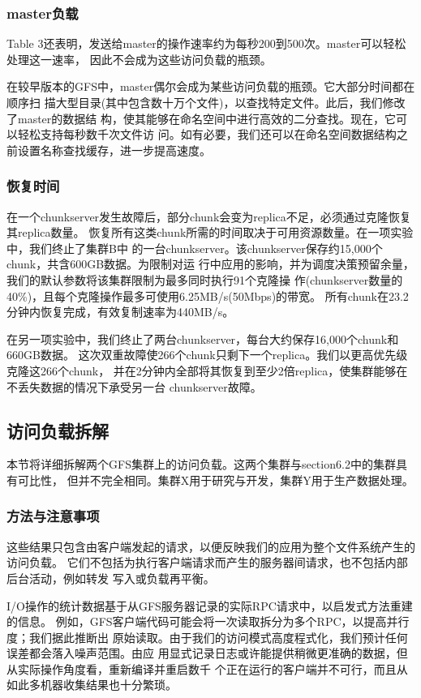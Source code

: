 \subsubsection{master负载}
Table 3还表明，发送给master的操作速率约为每秒200到500次。master可以轻松处理这一速率，
因此不会成为这些访问负载的瓶颈。

在较早版本的GFS中，master偶尔会成为某些访问负载的瓶颈。它大部分时间都在顺序扫
描大型目录(其中包含数十万个文件)，以查找特定文件。此后，我们修改了master的数据结
构，使其能够在命名空间中进行高效的二分查找。现在，它可以轻松支持每秒数千次文件访
问。如有必要，我们还可以在命名空间数据结构之前设置名称查找缓存，进一步提高速度。

\subsubsection{恢复时间}
在一个chunkserver发生故障后，部分chunk会变为replica不足，必须通过克隆恢复其replica数量。
恢复所有这类chunk所需的时间取决于可用资源数量。在一项实验中，我们终止了集群B中
的一台chunkserver。该chunkserver保存约15,000个chunk，共含600GB数据。为限制对运
行中应用的影响，并为调度决策预留余量，我们的默认参数将该集群限制为最多同时执行91个克隆操
作(chunkserver数量的40\%)，且每个克隆操作最多可使用6.25MB/s(50Mbps)的带宽。
所有chunk在23.2分钟内恢复完成，有效复制速率为440MB/s。

在另一项实验中，我们终止了两台chunkserver，每台大约保存16,000个chunk和660GB数据。
这次双重故障使266个chunk只剩下一个replica。我们以更高优先级克隆这266个chunk，
并在2分钟内全部将其恢复到至少2倍replica，使集群能够在不丢失数据的情况下承受另一台
chunkserver故障。


\subsection{访问负载拆解}
本节将详细拆解两个GFS集群上的访问负载。这两个集群与section6.2中的集群具有可比性，
但并不完全相同。集群X用于研究与开发，集群Y用于生产数据处理。

\subsubsection{方法与注意事项}

这些结果只包含由客户端发起的请求，以便反映我们的应用为整个文件系统产生的访问负载。
它们不包括为执行客户端请求而产生的服务器间请求，也不包括内部后台活动，例如转发
写入或负载再平衡。

I/O操作的统计数据基于从GFS服务器记录的实际RPC请求中，以启发式方法重建的信息。
例如，GFS客户端代码可能会将一次读取拆分为多个RPC，以提高并行度；我们据此推断出
原始读取。由于我们的访问模式高度程式化，我们预计任何误差都会落入噪声范围。由应
用显式记录日志或许能提供稍微更准确的数据，但从实际操作角度看，重新编译并重启数千
个正在运行的客户端并不可行，而且从如此多机器收集结果也十分繁琐。

